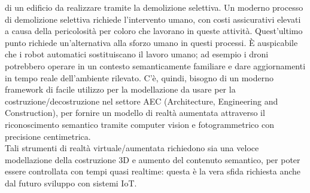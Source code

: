 di un edificio da realizzare tramite la demolizione selettiva. Un moderno processo di demolizione selettiva richiede l'intervento umano,
con costi assicurativi elevati a causa della pericolosità per coloro che lavorano in queste attività.
Quest'ultimo punto richiede un'alternativa alla sforzo umano in questi processi. \`E auspicabile che i robot automatici
sostituiscano il lavoro umano; ad esempio i droni potrebbero operare in un
contesto semanticamente familiare e dare aggiornamenti in tempo reale dell'ambiente rilevato.
C'è, quindi, bisogno di un moderno framework di facile utilizzo per la modellazione da usare per la
costruzione/decostruzione nel settore AEC (Architecture, Engineering and Construction),
per fornire un modello di realtà aumentata attraverso il riconoscimento semantico tramite computer vision e
fotogrammetrico con precisione centimetrica.\\
Tali strumenti di realtà virtuale/aumentata
richiedono sia una veloce modellazione della costruzione 3D e aumento del contenuto semantico, per poter essere controllata con
tempi quasi realtime: questa è la vera sfida richiesta anche dal futuro sviluppo con sistemi IoT.
\newpage
